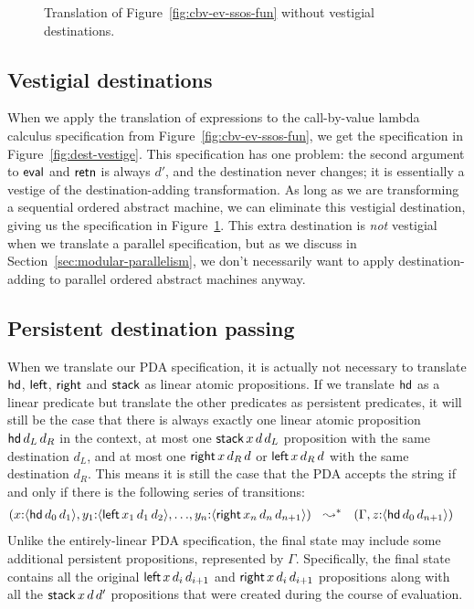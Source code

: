 \begin{figure}
\caption{Translation of Figure~\ref{fig:cbv-ev-ssos-fun} without vestigial destinations.}
\label{fig:dest-cbv}
\end{figure}



\subsection{Vestigial destinations}
\label{sec:vestigial}

When we apply the translation of expressions to the call-by-value
lambda calculus specification from Figure~\ref{fig:cbv-ev-ssos-fun},
we get the specification in Figure~\ref{fig:dest-vestige}.  This
specification has one problem: the second argument to ${\sf eval}$ and
${\sf retn}$ is always $d'$, and the destination never changes; it is
essentially a vestige of the destination-adding transformation. As
long as we are transforming a sequential ordered abstract machine, we
can eliminate this vestigial destination, giving us the specification
in Figure~\ref{fig:dest-cbv}. This extra destination is {\it not}
vestigial when we translate a parallel specification, but as we
discuss in Section~\ref{sec:modular-parallelism}, we don't necessarily
want to apply destination-adding to parallel ordered abstract machines
anyway.

\subsection{Persistent destination passing}
\label{sec:persistentdestpass}

When we translate our PDA specification, it is actually not necessary
to translate ${\sf hd}$, ${\sf left}$, ${\sf right}$ and ${\sf stack}$ as
linear atomic propositions. If we translate ${\sf hd}$ as
a linear predicate but translate the other predicates as persistent
predicates, it will still be the case that there is always exactly one
linear atomic proposition ${\sf hd}\,d_L\,d_R$ in the context, at most one
${\sf stack}\,x\,d\,d_L$ proposition with the same destination $d_L$, 
and at most one ${\sf right}\,x\,d_R\,d$ or ${\sf left}\,x\,d_R\,d$ 
with the same destination $d_R$. This means it is still the case that the
PDA accepts the string if and only if there is the following series of 
transitions:
\begin{align*}
(    x{:}\susp{{\sf hd}\,d_0\,d_1}, 
    y_1{:}\susp{{\sf left}\,x_1\,d_1\,d_2},
    \ldots&,
    y_n{:}\susp{{\sf right}\,x_n\,d_n\,d_{n+1}})%
~~ \leadsto^* ~~
(\Gamma, z{:}\susp{{\sf hd}\,d_0\,d_{n+1}})%
\end{align*}
Unlike the entirely-linear PDA specification, the final state may include
some additional 
persistent propositions, represented by $\Gamma$. Specifically, the final state
contains all the original ${\sf left}\,x\,d_i\,d_{i+1}$ and
${\sf right}\,x\,d_i\,d_{i+1}$ propositions 
along with all the ${\sf stack}\,x\,d\,d'$ propositions that were created
during the course of evaluation.

